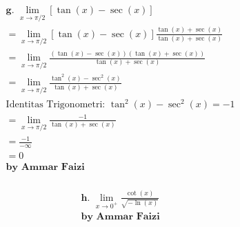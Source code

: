 \documentclass[12pt]{article}
\begin{document}
\begin{fleqn}[1em]
\begin{align*}
\boxed{
\begin{aligned}
  & \textbf{g. } \lim_{x \to \pi/2} \left[\tan(x) - \sec(x)\right] \\
  & = \lim_{x \to \pi/2} \left[\tan(x) - \sec(x)\right] \frac{\tan(x) + \sec(x)}{\tan(x) + \sec(x)} \\
  & = \lim_{x \to \pi/2} \frac{(\tan(x) - \sec(x))(\tan(x) + \sec(x))}{\tan(x) + \sec(x)} \\
  & = \lim_{x \to \pi/2} \frac{\tan ^2\left(x\right)-\sec ^2\left(x\right)}{\tan(x) + \sec(x)} \\
  & \boxed{\text{Identitas Trigonometri: } \tan ^2\left(x\right)-\sec ^2\left(x\right)=-1} \\
  & = \lim_{x \to \pi/2} \frac{-1}{\tan(x) + \sec(x)} \\
  & = \frac{-1}{-\infty} \\
  & = 0
  \\ & \textbf{by Ammar Faizi}
\end{aligned}
}
\end{align*}

\begin{align*}
\boxed{
\begin{aligned}
  & \textbf{h. } \lim_{x \to 0^{+}} \frac{\cot(x)}{\sqrt{-\ln(x)}}
  \\ & \textbf{by Ammar Faizi}
\end{aligned}
}
\end{align*}

\end{fleqn}
\end{document}
